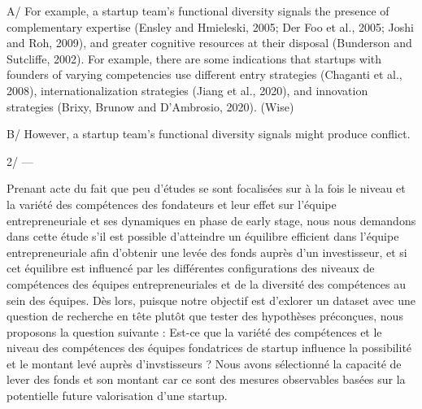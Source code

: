 \documentclass[11pt]{article}
\begin{document}
A/ For example, a startup team’s functional diversity signals the presence of complementary expertise (Ensley and Hmieleski, 2005; Der Foo et al., 2005; Joshi and Roh, 2009), and greater cognitive resources at their disposal (Bunderson and Sutcliffe, 2002). For example, there are some indications that startups with founders of varying competencies use different entry strategies (Chaganti et al., 2008), internationalization strategies (Jiang et al., 2020), and innovation strategies (Brixy, Brunow and D’Ambrosio, 2020). (Wise)

B/ However, a startup team’s functional diversity signals might produce conflict.

2/
---

Prenant acte du fait que peu d'études se sont focalisées sur à la fois le niveau et la variété des compétences des fondateurs et leur effet sur l'équipe entrepreneuriale et ses dynamiques en phase de early stage, nous nous demandons dans cette étude s'il est possible d'atteindre un équilibre efficient dans l'équipe entrepreneuriale afin d'obtenir une levée des fonds auprès d'un investisseur, et si cet équilibre est influencé par les différentes configurations des niveaux de compétences des équipes entrepreneuriales et de la diversité des compétences au sein des équipes. Dès lors, puisque notre objectif est d'exlorer un dataset avec une question de recherche en tête plutôt que tester des hypothèses préconçues, nous proposons la question suivante : Est-ce que la variété des compétences et le niveau des compétences des équipes fondatrices de startup influence la possibilité et le montant levé auprès d'invstisseurs ? Nous avons sélectionné la capacité de lever des fonds et son montant car ce sont des mesures observables basées sur la potentielle future valorisation d'une startup.
\end{document}
